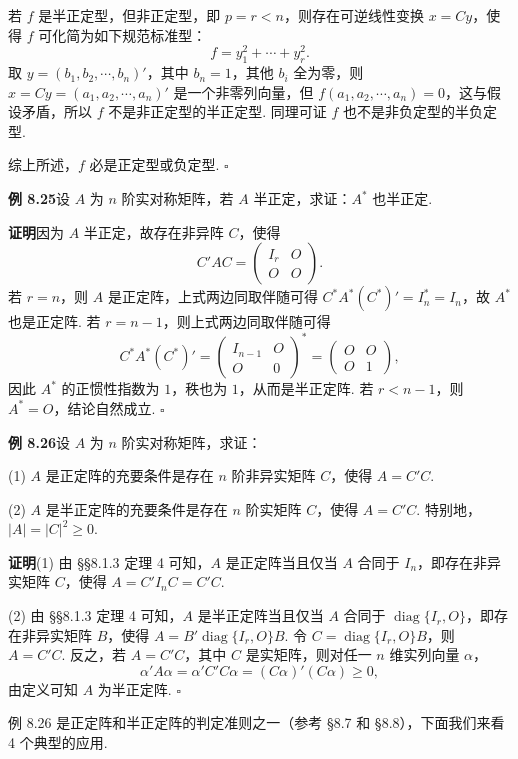 \documentclass[UTF8, 12pt, fontset=fandol, oneside]{ctexart}
\begin{document}
若 $f$ 是半正定型，但非正定型，即 $p=r<n$，则存在可逆线性变换 $x=Cy$，使得 $f$ 可化简为如下规范标准型：
\[
f=y_1^2+\cdots+y_r^2.
\]
取 $y=(b_1,b_2,\cdots,b_n)'$，其中 $b_n=1$，其他 $b_i$ 全为零，则 $x=Cy=(a_1,a_2,\cdots,a_n)'$ 是一个非零列向量，但 $f(a_1,a_2,\cdots,a_n)=0$，这与假设矛盾，所以 $f$ 不是非正定型的半正定型. 同理可证 $f$ 也不是非负定型的半负定型.

综上所述，$f$ 必是正定型或负定型. $\ensuremath{\square}$

\noindent\textbf{例 8.25}\quad 设 $A$ 为 $n$ 阶实对称矩阵，若 $A$ 半正定，求证：$A^*$ 也半正定.

\noindent\textbf{证明}\quad 因为 $A$ 半正定，故存在非异阵 $C$，使得
\[
C'AC=\left(\begin{array}{cc}
I_r & O\\
O & O
\end{array}\right).
\]
若 $r=n$，则 $A$ 是正定阵，上式两边同取伴随可得 $C^*A^*(C^*)'=I_n^*=I_n$，故 $A^*$ 也是正定阵. 若 $r=n-1$，则上式两边同取伴随可得
\[
C^*A^*(C^*)'=
\left(\begin{array}{cc}
I_{n-1} & O\\
O & 0
\end{array}\right)^*
=
\left(\begin{array}{cc}
O & O\\
O & 1
\end{array}\right),
\]
因此 $A^*$ 的正惯性指数为 $1$，秩也为 $1$，从而是半正定阵. 若 $r<n-1$，则 $A^*=O$，结论自然成立. $\ensuremath{\square}$

\noindent\textbf{例 8.26}\quad 设 $A$ 为 $n$ 阶实对称矩阵，求证：

(1) $A$ 是正定阵的充要条件是存在 $n$ 阶非异实矩阵 $C$，使得 $A=C'C$.

(2) $A$ 是半正定阵的充要条件是存在 $n$ 阶实矩阵 $C$，使得 $A=C'C$. 特别地，$|A|=|C|^2\ge 0$.

\noindent\textbf{证明}\quad (1) 由 §§8.1.3 定理 4 可知，$A$ 是正定阵当且仅当 $A$ 合同于 $I_n$，即存在非异实矩阵 $C$，使得 $A=C'I_nC=C'C$.

(2) 由 §§8.1.3 定理 4 可知，$A$ 是半正定阵当且仅当 $A$ 合同于 $\operatorname{diag}\{I_r,O\}$，即存在非异实矩阵 $B$，使得 $A=B'\operatorname{diag}\{I_r,O\}B$. 令 $C=\operatorname{diag}\{I_r,O\}B$，则 $A=C'C$. 反之，若 $A=C'C$，其中 $C$ 是实矩阵，则对任一 $n$ 维实列向量 $\alpha$，
\[
\alpha'A\alpha=\alpha'C'C\alpha=(C\alpha)'(C\alpha)\ge 0,
\]
由定义可知 $A$ 为半正定阵. $\ensuremath{\square}$

例 8.26 是正定阵和半正定阵的判定准则之一（参考 §8.7 和 §8.8），下面我们来看 4 个典型的应用.
\end{document}
